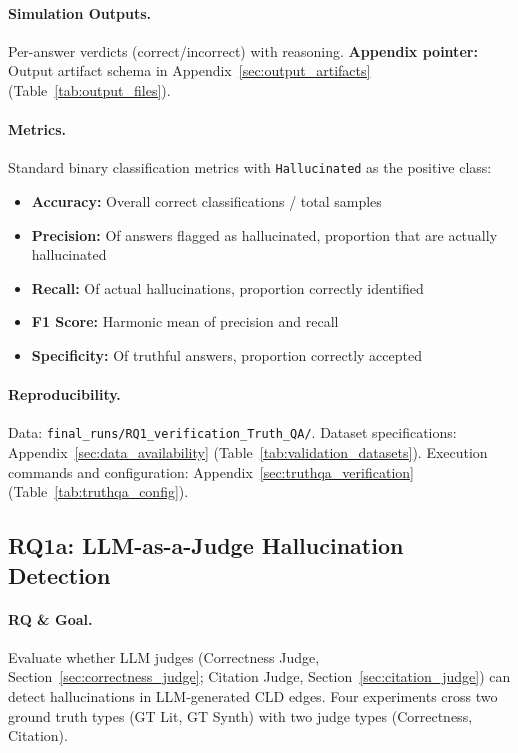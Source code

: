 \paragraph{Simulation Outputs.}
Per-answer verdicts (correct/incorrect) with reasoning.
\textbf{Appendix pointer:} Output artifact schema in Appendix~\ref{sec:output_artifacts} (Table~\ref{tab:output_files}).

\paragraph{Metrics.}
Standard binary classification metrics with \texttt{Hallucinated} as the positive class:
\begin{itemize}[noitemsep]
    \item \textbf{Accuracy:} Overall correct classifications / total samples
    \item \textbf{Precision:} Of answers flagged as hallucinated, proportion that are actually hallucinated
    \item \textbf{Recall:} Of actual hallucinations, proportion correctly identified
    \item \textbf{F1 Score:} Harmonic mean of precision and recall
    \item \textbf{Specificity:} Of truthful answers, proportion correctly accepted
\end{itemize}

\paragraph{Reproducibility.}
Data: \texttt{final\_runs/RQ1\_verification\_Truth\_QA/}. Dataset specifications: Appendix~\ref{sec:data_availability} (Table~\ref{tab:validation_datasets}). Execution commands and configuration: Appendix~\ref{sec:truthqa_verification} (Table~\ref{tab:truthqa_config}).

\subsection{RQ1a: LLM-as-a-Judge Hallucination Detection}
\label{sec:rq1a_experiments}

\paragraph{RQ \& Goal.}
Evaluate whether LLM judges (Correctness Judge, Section~\ref{sec:correctness_judge}; Citation Judge, Section~\ref{sec:citation_judge}) can detect hallucinations in LLM-generated CLD edges. Four experiments cross two ground truth types (GT Lit, GT Synth) with two judge types (Correctness, Citation).

